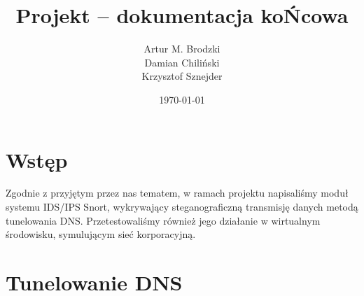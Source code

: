 \documentclass{eiti-raport}
\begin{document}
\author{Artur M. Brodzki \\ Damian Chiliński \\ Krzysztof Sznejder}
\date{\today}
\subject{BCYB 19L}
\title{Projekt -- dokumentacja koŃcowa}

\maketitle


\section{Wstęp} \label{sec:intro}
Zgodnie z przyjętym przez nas tematem, w ramach projektu napisaliśmy moduł systemu IDS/IPS Snort, wykrywający steganograficzną transmisję danych metodą tunelowania DNS. Przetestowaliśmy również jego działanie w wirtualnym środowisku, symulującym sieć korporacyjną. 

\section{Tunelowanie DNS} \label{sec:2}
\end{document}
